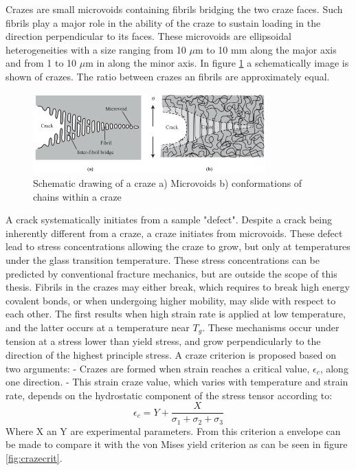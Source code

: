 Crazes are small microvoids containing fibrils bridging the two craze faces. Such fibrils play a major role in the ability of the craze to sustain loading in the direction perpendicular to its faces. These microvoids are ellipsoidal heterogeneities with a size ranging from 10 $\mu$m to 10 mm along the major axis and from 1 to 10 $\mu$m in along the minor axis. In figure \ref{fig:Craze} a schematically image is shown of crazes. The ratio between crazes an fibrils are approximately equal.  

\begin{figure}[htb]
    \centering
    \includegraphics[width=0.8\textwidth]{chapter_2/figures/Craze.png}
    \caption{Schematic drawing of a craze a) Microvoids b) conformations of chains within a craze \cite{Halary2011PolymerMaterials}}
    \label{fig:Craze}
\end{figure}
A crack systematically initiates from a sample "defect". Despite a crack being inherently different from a craze, a craze initiates from microvoids. These defect lead to stress concentrations allowing the craze to grow, but only at temperatures under the glass transition temperature. These stress concentrations can be predicted by conventional fracture mechanics, but are outside the scope of this thesis. Fibrils in the crazes may either break, which requires to break high energy covalent bonds, or when undergoing higher mobility, may slide with respect to each other. The first results when high strain rate is applied at low temperature, and the latter occurs at a  temperature near $T_g$. These mechanisms occur under tension at a stress lower than yield stress, and grow perpendicularly to the direction of the highest principle stress.
A craze criterion is proposed based on two arguments:
- Crazes are formed when strain reaches a critical value, $\epsilon_c$, along one direction.
- This strain craze value, which varies with temperature and strain rate, depends on the hydrostatic component of the stress tensor according to:
\begin{equation} \label{eqn:crazecriterion}
 \epsilon_c=Y+\frac{X}{\sigma_1+\sigma_2+\sigma_3}
\end{equation}
Where X an Y are experimental parameters. From this criterion a envelope can be made to compare it with the von Mises yield criterion as can be seen in figure \ref{fig:crazecrit}. 

